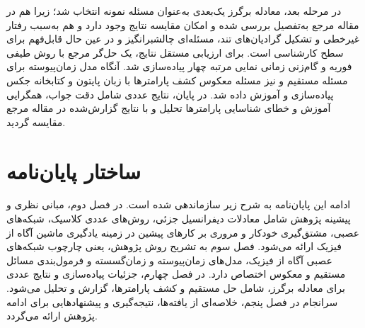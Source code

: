 در مرحله بعد، معادله برگرز یک‌بعدی به‌عنوان مسئله نمونه انتخاب شد؛ زیرا هم
در مقاله مرجع به‌تفصیل بررسی شده و امکان مقایسه نتایج وجود دارد و هم به‌سبب
رفتار غیرخطی و تشکیل گرادیان‌های تند، مسئله‌ای چالشبرانگیز و در عین حال
قابل‌فهم برای سطح کارشناسی است. برای ارزیابی مستقل نتایج، یک حل‌گر مرجع با
روش طیفی فوریه و گام‌زنی زمانی نمایی مرتبه چهار پیاده‌سازی شد. آنگاه
مدل زمان‌پیوسته برای مسئله مستقیم و نیز مسئله معکوس کشف پارامترها با زبان
پایتون و کتابخانه جکس پیاده‌سازی و آموزش داده شد. در پایان، نتایج عددی شامل
دقت جواب، همگرایی آموزش و خطای شناسایی پارامترها تحلیل و با نتایج گزارش‌شده
در مقاله مرجع مقایسه گردید.

\section{ساختار پایان‌نامه}
\label{sec:structure}

ادامه این پایان‌نامه به شرح زیر سازماندهی شده است. در فصل دوم، مبانی نظری و
پیشینه پژوهش شامل معادلات دیفرانسیل جزئی، روش‌های عددی کلاسیک، شبکه‌های
عصبی، مشتق‌گیری خودکار و مروری بر کارهای پیشین در زمینه یادگیری ماشین آگاه
از فیزیک ارائه می‌شود. فصل سوم به تشریح روش پژوهش، یعنی چارچوب شبکه‌های
عصبی آگاه از فیزیک، مدل‌های زمان‌پیوسته و زمان‌گسسته و فرمول‌بندی مسائل
مستقیم و معکوس اختصاص دارد. در فصل چهارم، جزئیات پیاده‌سازی و نتایج عددی
برای معادله برگرز، شامل حل مستقیم و کشف پارامترها، گزارش و تحلیل می‌شود.
سرانجام در فصل پنجم، خلاصه‌ای از یافته‌ها، نتیجه‌گیری و پیشنهادهایی برای
ادامه پژوهش ارائه می‌گردد.
